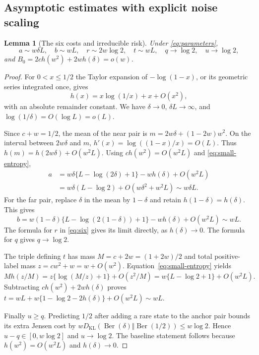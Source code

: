 \documentclass[11pt]{article}
\newtheorem{lemma}[theorem]{Lemma}
\theoremstyle{remark}\newtheorem{remark}[theorem]{Remark}
\newcommand{\KL}{D_{\mathrm{KL}}}
\begin{document}
\subsection{Asymptotic estimates with explicit noise scaling}
\begin{lemma}[The six costs and irreducible risk]
\label{lem:asymptotics}
Under \eqref{eq:parameters},
\begin{equation}
 a\sim w\delta L,\quad b\sim wL,\quad r\sim2w\log2,
 \quad t\sim wL,\quad q\to\log2,\quad u\to\log2,
 \label{eq:cost-asymptotics}
\end{equation}
and $B_0=2c h(w^2)+2w h(\delta)=o(w)$.
\end{lemma}
\begin{proof}
For $0<x\le1/2$ the Taylor expansion of $-\log(1-x)$, or its geometric
series integrated once, gives
\begin{equation}
 h(x)=x\log(1/x)+x+O(x^2),
 \label{eq:small-entropy}
\end{equation}
with an absolute remainder constant. We have $\delta\to0$,
$\delta L\to\infty$, and $\log(1/\delta)=O(\log L)=o(L)$.

Since $c+w=1/2$, the mean of the near pair is
$m=2w\delta+(1-2w)w^2$. On the interval between $2w\delta$ and $m$,
$h'(x)=\log((1-x)/x)=O(L)$. Thus
$h(m)=h(2w\delta)+O(w^2L)$. Using
$c h(w^2)=O(w^2L)$ and \eqref{eq:small-entropy},
\begin{align*}
 a&=w\delta\{L-\log(2\delta)+1\}-w h(\delta)+O(w^2L)\\
  &=w\delta(L-\log2)+O(w\delta^2+w^2L)
   \sim w\delta L.
\end{align*}
For the far pair, replace $\delta$ in the mean by $1-\delta$ and retain
$h(1-\delta)=h(\delta)$. This gives
\[
 b=w(1-\delta)\{L-\log(2(1-\delta))+1\}
        -w h(\delta)+O(w^2L)\sim wL.
\]
The formula for $r$ in \eqref{eq:six} gives its limit directly, as
$h(\delta)\to0$. The formula for $q$ gives $q\to\log2$.

The triple defining $t$ has mass $M=c+2w=(1+2w)/2$ and total positive-label
mass $z=cw^2+w=w+O(w^2)$. Equation~\eqref{eq:small-entropy} yields
\[
 M h(z/M)=z\{\log(M/z)+1\}+O(z^2/M)
         =w\{L-\log2+1\}+O(w^2L).
\]
Subtracting $c h(w^2)+2w h(\delta)$ proves
$t=wL+w\{1-\log2-2h(\delta)\}+O(w^2L)\sim wL$.

Finally $u\ge q$. Predicting $1/2$ after adding a rare state to the
anchor pair bounds its extra Jensen cost by
$w\KL(\operatorname{Ber}(\delta)\Vert\operatorname{Ber}(1/2))
\le w\log2$. Hence $u-q\in[0,w\log2]$ and $u\to\log2$.
The baseline statement follows because $h(w^2)=O(w^2L)$ and
$h(\delta)\to0$.
\end{proof}
\end{document}
